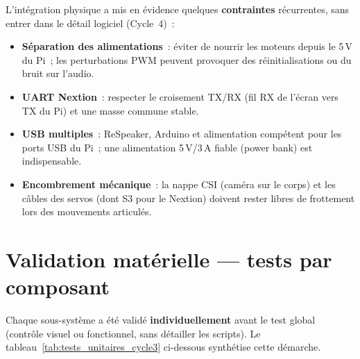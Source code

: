 \documentclass[a4paper,12pt]{report}
\begin{document}
	L'intégration physique a mis en évidence quelques \textbf{contraintes}
	récurrentes, sans entrer dans le détail logiciel (Cycle~4)~:
	\begin{itemize}
		\item \textbf{Séparation des alimentations}~: éviter de nourrir les moteurs
		depuis le 5\,V du Pi~; les perturbations PWM peuvent provoquer des
		réinitialisations ou du bruit sur l'audio.
		\item \textbf{UART Nextion}~: respecter le croisement TX/RX (fil RX de
		l'écran vers TX du Pi) et une masse commune stable.
		\item \textbf{USB multiples}~: ReSpeaker, Arduino et alimentation
		compétent pour les ports USB du Pi~; une alimentation 5\,V/3\,A fiable
		(power bank) est indispensable.
		\item \textbf{Encombrement mécanique}~: la nappe CSI (caméra sur le corps)
		et les câbles des servos (dont S3 pour le Nextion) doivent rester libres
		de frottement lors des mouvements articulés.
	\end{itemize}
	
	\section{Validation matérielle — tests par composant}
	
	Chaque sous-système a été validé \textbf{individuellement} avant le test
	global (contrôle visuel ou fonctionnel, sans détailler les scripts).
	Le tableau~\ref{tab:tests_unitaires_cycle3} ci-dessous synthétise cette
	démarche.
	
\end{document}
